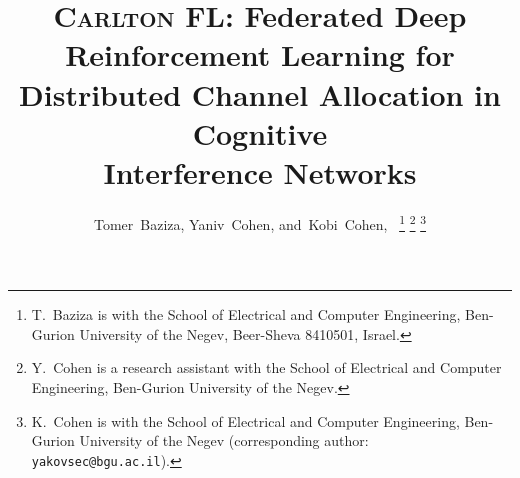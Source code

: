\documentclass[journal]{IEEEtran}
\begin{document}
\title{\textsc{Carlton FL}: Federated Deep Reinforcement Learning for\\
Distributed Channel Allocation in Cognitive\\
Interference Networks}

\author{Tomer~Baziza,
        Yaniv~Cohen,
        and~Kobi~Cohen,~%
\thanks{T.~Baziza is with the School of Electrical and Computer Engineering,
Ben-Gurion University of the Negev, Beer-Sheva 8410501, Israel.}%
\thanks{Y.~Cohen is a research assistant with the School of Electrical and
Computer Engineering, Ben-Gurion University of the Negev.}%
\thanks{K.~Cohen is with the School of Electrical and Computer Engineering,
Ben-Gurion University of the Negev (corresponding author:
\texttt{yakovsec@bgu.ac.il}).}}

\maketitle
\end{document}
